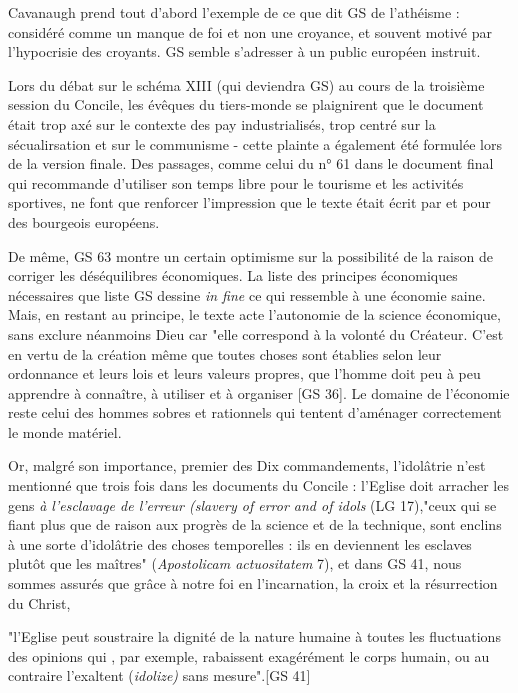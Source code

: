 Cavanaugh prend tout d'abord l'exemple de ce que dit GS de l'athéisme : considéré comme un manque de foi et non une croyance, et souvent motivé par l'hypocrisie des croyants. GS semble s'adresser à un public européen instruit.
\begin{singlequote}
    Lors du débat sur le schéma XIII (qui deviendra GS) au cours de la troisième session du Concile, les évêques du tiers-monde se plaignirent que le document était trop axé sur le contexte des pay industrialisés, trop centré sur la sécualirsation et sur le communisme - cette plainte a également été formulée lors de la version finale. Des passages, comme celui du n° 61 dans le document final qui recommande d'utiliser son temps libre pour le tourisme et les activités sportives, ne font que renforcer l'impression que le texte était écrit par et pour des bourgeois européens. \cite[p. 130]{cavanaugh_idolatrie_2022}
\end{singlequote}
De même, GS 63 montre un certain optimisme sur la possibilité de la raison de corriger les déséquilibres économiques. La liste des principes économiques nécessaires que liste GS dessine \textit{in fine} ce qui ressemble à une économie saine. Mais, en restant au principe, le texte acte l'autonomie de la science économique, sans exclure néanmoins Dieu car "elle correspond à la volonté du Créateur. C'est en vertu de la création même que toutes choses sont établies selon leur ordonnance et leurs lois et leurs valeurs propres, que l'homme doit peu à peu apprendre à connaître, à utiliser et à organiser  [GS 36]. Le domaine de l'économie reste celui des hommes sobres et rationnels qui tentent d'aménager correctement le monde matériel.

Or, malgré son  importance,  premier des Dix commandements, l'idolâtrie n'est mentionné que trois fois dans les documents du Concile : l'Eglise doit arracher les gens \textit{à l'esclavage de l'erreur (\textit{slavery of error and of idols}} (LG 17),"ceux qui se fiant plus que de raison aux progrès de la science et de la technique, sont enclins à une sorte d'idolâtrie des choses temporelles : ils en deviennent les esclaves plutôt que les maîtres" (\textit{Apostolicam actuositatem} 7), et dans GS 41, nous sommes assurés que grâce à notre foi en l'incarnation, la croix et la résurrection du Christ, \begin{singlequote}
    "l'Eglise peut soustraire la dignité de la nature humaine à toutes les fluctuations des opinions qui , par exemple, rabaissent exagérément le corps humain, ou au contraire l'exaltent (\textit{idolize) }sans mesure".[GS 41]
\end{singlequote}

